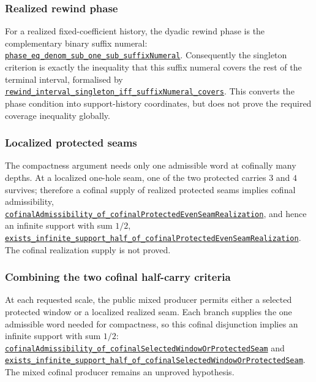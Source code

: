 \documentclass[11pt]{article}
\newcommand{\commit}{81150c1c6fdd4cd51e76d3aa0de344341e0e9e7c}
\newcommand{\repobase}{https://github.com/wcook04/plectis-lean-erdos249-257/blob/\commit}
\newcommand{\PK}{Erdos249257}
\newcommand{\lref}[3]{\href{\repobase/\PK/#1\#L#2}{\nolinkurl{#3}}}
\newcommand{\lrefx}[3]{\href{\repobase/\PK/#1\#L#2}{\nolinkurl{#3}}}
\theoremstyle{definition}
\theoremstyle{remark}
\begin{document}
\subsubsection{Realized rewind phase}\label{res:rewindphase}

For a realized fixed-coefficient history, the dyadic rewind phase is the
complementary binary suffix numeral:
\lref{HalfCarryRewindPhase.lean}{39}{phase_eq_denom_sub_one_sub_suffixNumeral}.
Consequently the singleton criterion is exactly the inequality that this
suffix numeral covers the rest of the terminal interval,
formalised by
\lrefx{HalfCarryRewindPhase.lean}{65}{rewind_interval_singleton_iff_suffixNumeral_covers}.
This converts the phase condition into support-history coordinates, but does
not prove the required coverage inequality globally.

\subsubsection{Localized protected seams}\label{res:protectedseam}

The compactness argument needs only one admissible word at cofinally many
depths.  At a localized one-hole seam, one of the two protected carries $3$
and $4$ survives; therefore a cofinal supply of realized protected seams
implies cofinal admissibility,
\lref{HalfCarryProtectedSeamConsumer.lean}{31}{cofinalAdmissibility_of_cofinalProtectedEvenSeamRealization},
and hence an infinite support with sum $1/2$,
\lrefx{HalfCarryProtectedSeamConsumer.lean}{53}{exists_infinite_support_half_of_cofinalProtectedEvenSeamRealization}.
The cofinal realization supply is not proved.

\subsubsection{Combining the two cofinal half-carry criteria}\label{res:cofinalwindowseam}

At each requested scale, the public mixed producer permits either a selected
protected window or a localized realized seam.  Each branch supplies the one
admissible word needed for compactness, so this cofinal disjunction implies
an infinite support with sum $1/2$:
\lref{HalfCarryCofinalWindowOrSeamConsumer.lean}{32}{cofinalAdmissibility_of_cofinalSelectedWindowOrProtectedSeam}
and
\lrefx{HalfCarryCofinalWindowOrSeamConsumer.lean}{58}{exists_infinite_support_half_of_cofinalSelectedWindowOrProtectedSeam}.
The mixed cofinal producer remains an unproved hypothesis.
\end{document}
